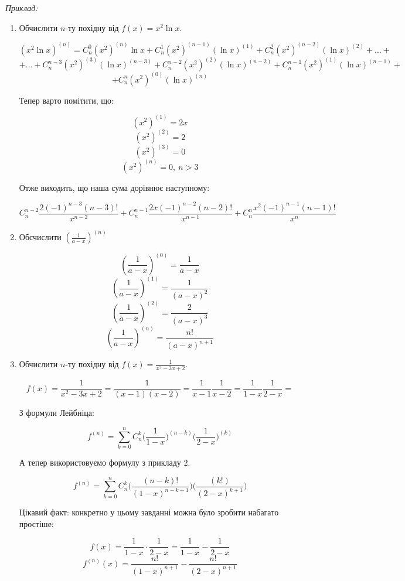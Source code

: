 \documentclass[12pt]{report}
\begin{document}
\textit{Приклад:}
\begin{enumerate}
\item
Обчислити $n$-ту похідну від $f(x) = x^2 \ln x$.

$$(x^2 \ln x)^{(n)} = C_n^0 (x^2)^{(n)} \ln x + C_n^1 (x^2)^{(n-1)} (\ln x)^{(1)} + C_n^2 (x^2)^{(n-2)} (\ln x)^{(2)} + \ldots + $$
$$+ \ldots + C_n^{n-3} (x^2)^{(3)} (\ln x)^{(n - 3)} + C_n^{n-2} (x^2)^{(2)} (\ln x)^{(n - 2)} + C_n^{n-1} (x^2)^{(1)} (\ln x)^{(n - 1)} + $$
$$+ C_n^{n} (x^2)^{(0)} (\ln x)^{(n)}$$

Тепер варто помітити, що:

$$(x^2)^{(1)} = 2x$$
$$(x^2)^{(2)} = 2$$
$$(x^2)^{(3)} = 0$$
$$(x^2)^{(n)} = 0,\ n > 3$$

Отже виходить, що наша сума дорівнює наступному:

$$C_n^{n-2}  \frac{2 (-1)^{n-3}(n-3)!}{x^{n-2}} + C_n^{n-1}  \frac{2x (-1)^{n-2}(n-2)!}{x^{n-1}}+ C_n^{n} \frac{ x^2 (-1)^{n-1}(n-1)!}{x^{n}}$$

\item Обсчислити $(\frac{1}{a-x})^{(n)}$

$$(\frac{1}{a-x})^{(0)} = \frac{1}{a-x}$$
$$(\frac{1}{a-x})^{(1)} = \frac{1}{(a-x)^2}$$
$$(\frac{1}{a-x})^{(2)} = \frac{2}{(a-x)^3}$$
$$(\frac{1}{a-x})^{(n)} = \frac{n!}{(a-x)^{n+1}}$$

\item Обчислити $n$-ту похідну від $f(x) = \frac{1}{x^2 - 3x + 2}$.

$$f(x) = \frac{1}{x^2 - 3x + 2} = \frac{1}{(x-1)(x-2)} = \frac{1}{x-1} \frac{1}{x-2} = \frac{1}{1-x} \frac{1}{2-x} = $$

З формули Лейбніца:

$$f^{(n)} = \sum_{k = 0}^{n} C_n^k \Big( \frac{1}{1-x}\Big)^{(n-k)} \Big( \frac{1}{2-x}\Big)^{(k)}$$

А тепер використовуємо формулу з прикладу $2$.

$$f^{(n)} = \sum_{k = 0}^{n} C_n^k \Big( \frac{(n-k)!}{(1-x)^{n-k+1}}\Big) \Big( \frac{(k!)}{(2-x)^{k+1}}\Big)$$

Цікавий факт: конкретно у цьому завданні можна було зробити набагато простіше:

$$f(x) = \frac{1}{1-x} \cdot \frac{1}{2 - x} = \frac{1}{1-x} - \frac{1}{2-x}$$
$$f^{(n)}(x) = \frac{n!}{(1-x)^{n+1}} - \frac{n!}{(2-x)^{n+1}}$$

\end{enumerate}

\vspace{2mm}
\end{document}
